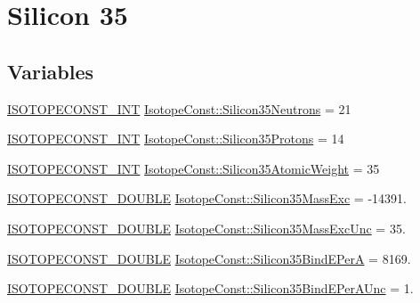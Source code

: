 \hypertarget{group___isotope_const-_silicon-_si35}{}\section{Silicon 35}
\label{group___isotope_const-_silicon-_si35}
\subsection*{Variables}
\begin{DoxyCompactItemize}
\item 
\mbox{\hyperlink{group___isotope_const-_macros_ga5f18360b3e99483a35c32d789e62621c}{I\+S\+O\+T\+O\+P\+E\+C\+O\+N\+S\+T\+\_\+\+I\+NT}} \mbox{\hyperlink{group___isotope_const-_silicon-_si35_ga8fe58f57be539fc51b9f4c8c3039cd09}{Isotope\+Const\+::\+Silicon35\+Neutrons}} = 21
\item 
\mbox{\hyperlink{group___isotope_const-_macros_ga5f18360b3e99483a35c32d789e62621c}{I\+S\+O\+T\+O\+P\+E\+C\+O\+N\+S\+T\+\_\+\+I\+NT}} \mbox{\hyperlink{group___isotope_const-_silicon-_si35_ga5c9496cbaa50172bb1756ac811fe2fb2}{Isotope\+Const\+::\+Silicon35\+Protons}} = 14
\item 
\mbox{\hyperlink{group___isotope_const-_macros_ga5f18360b3e99483a35c32d789e62621c}{I\+S\+O\+T\+O\+P\+E\+C\+O\+N\+S\+T\+\_\+\+I\+NT}} \mbox{\hyperlink{group___isotope_const-_silicon-_si35_ga14d52adb3886b351c688e747dc769c01}{Isotope\+Const\+::\+Silicon35\+Atomic\+Weight}} = 35
\item 
\mbox{\hyperlink{group___isotope_const-_macros_ga8f45a7272ce02c0b4c65c44636ed719a}{I\+S\+O\+T\+O\+P\+E\+C\+O\+N\+S\+T\+\_\+\+D\+O\+U\+B\+LE}} \mbox{\hyperlink{group___isotope_const-_silicon-_si35_gabfc68e011ca59180c107fbdbc9facad6}{Isotope\+Const\+::\+Silicon35\+Mass\+Exc}} = -\/14391.
\item 
\mbox{\hyperlink{group___isotope_const-_macros_ga8f45a7272ce02c0b4c65c44636ed719a}{I\+S\+O\+T\+O\+P\+E\+C\+O\+N\+S\+T\+\_\+\+D\+O\+U\+B\+LE}} \mbox{\hyperlink{group___isotope_const-_silicon-_si35_ga707d57a4e7444ca43632dd56b3bf46b1}{Isotope\+Const\+::\+Silicon35\+Mass\+Exc\+Unc}} = 35.
\item 
\mbox{\hyperlink{group___isotope_const-_macros_ga8f45a7272ce02c0b4c65c44636ed719a}{I\+S\+O\+T\+O\+P\+E\+C\+O\+N\+S\+T\+\_\+\+D\+O\+U\+B\+LE}} \mbox{\hyperlink{group___isotope_const-_silicon-_si35_ga6ed48eff49eb772a251471cba1e39a23}{Isotope\+Const\+::\+Silicon35\+Bind\+E\+PerA}} = 8169.
\item 
\mbox{\hyperlink{group___isotope_const-_macros_ga8f45a7272ce02c0b4c65c44636ed719a}{I\+S\+O\+T\+O\+P\+E\+C\+O\+N\+S\+T\+\_\+\+D\+O\+U\+B\+LE}} \mbox{\hyperlink{group___isotope_const-_silicon-_si35_ga967e4d268831668e7ba36aeb5ab2a4cf}{Isotope\+Const\+::\+Silicon35\+Bind\+E\+Per\+A\+Unc}} = 1.

\end{DoxyCompactItemize}
